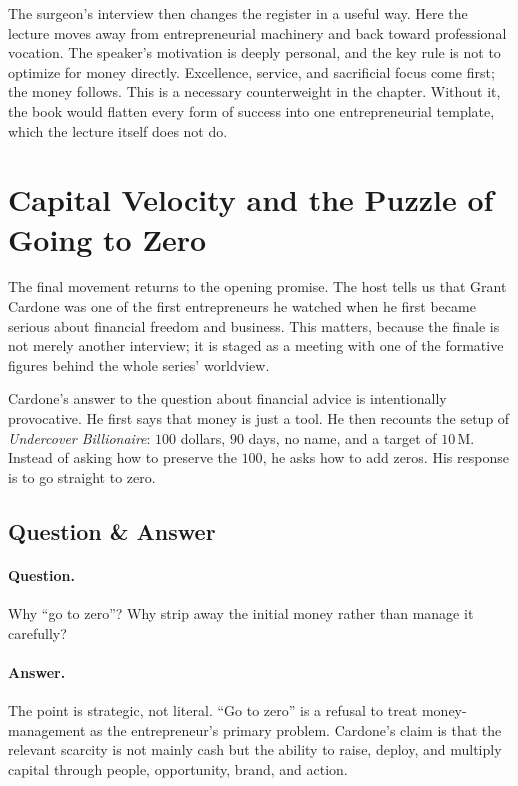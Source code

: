 The surgeon's interview then changes the register in a useful way. Here the lecture moves away from entrepreneurial machinery and back toward professional vocation. The speaker's motivation is deeply personal, and the key rule is not to optimize for money directly. Excellence, service, and sacrificial focus come first; the money follows. This is a necessary counterweight in the chapter. Without it, the book would flatten every form of success into one entrepreneurial template, which the lecture itself does not do.

\section{Capital Velocity and the Puzzle of Going to Zero}

The final movement returns to the opening promise. The host tells us that Grant Cardone was one of the first entrepreneurs he watched when he first became serious about financial freedom and business. This matters, because the finale is not merely another interview; it is staged as a meeting with one of the formative figures behind the whole series' worldview.

Cardone's answer to the question about financial advice is intentionally provocative. He first says that money is just a tool. He then recounts the setup of \emph{Undercover Billionaire}: \(100\) dollars, \(90\) days, no name, and a target of \(10\,\mathrm{M}\). Instead of asking how to preserve the \(100\), he asks how to add zeros. His response is to go straight to zero.

\subsection{Question \& Answer}

\paragraph{Question.}
Why ``go to zero''? Why strip away the initial money rather than manage it carefully?

\paragraph{Answer.}
The point is strategic, not literal. ``Go to zero'' is a refusal to treat money-management as the entrepreneur's primary problem. Cardone's claim is that the relevant scarcity is not mainly cash but the ability to raise, deploy, and multiply capital through people, opportunity, brand, and action.

